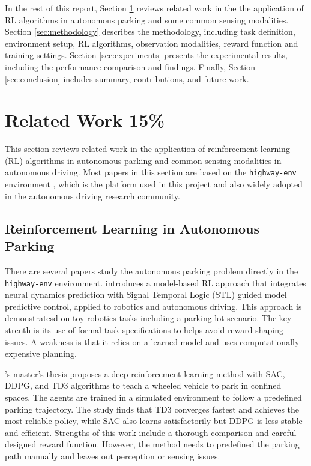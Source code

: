 \documentclass{article}
\begin{document}
In the rest of this report, Section \ref{sec:related_work} reviews related work in the the application of RL algorithms in autonomous parking and some common sensing modalities. Section \ref{sec:methodology} describes the methodology, including task definition, environment setup, RL algorithms, observation modalities, reward function and training settings. Section \ref{sec:experiments} presents the experimental results, including the performance comparison and findings. Finally, Section \ref{sec:conclusion} includes summary, contributions, and future work.

\newpage

\section{Related Work 15\%}\label{sec:related_work}

This section reviews related work in the application of reinforcement learning (RL) algorithms in autonomous parking and common sensing modalities in autonomous driving. Most papers in this section are based on the \texttt{highway-env} environment \cite{highway-env}, which is the platform used in this project and also widely adopted in the autonomous driving research community.

\subsection{Reinforcement Learning in Autonomous Parking}

There are several papers study the autonomous parking problem directly in the \texttt{highway-env} environment. \citet{kapoor2020model} introduces a model-based RL approach that integrates neural dynamics prediction with Signal Temporal Logic (STL) guided model predictive control, applied to robotics and autonomous driving. This approach is demonstratesd on toy robotics tasks including a parking-lot scenario. The key strenth is its use of formal task specifications to helps avoid reward-shaping issues. A weakness is that it relies on a learned model and uses computationally expensive planning.

\citet{moreira2021deep}'s master's thesis proposes a deep reinforcement learning method with SAC, DDPG, and TD3 algorithms to teach a wheeled vehicle to park in confined spaces. The agents are trained in a simulated environment to follow a predefined parking trajectory. The study finds that TD3 converges fastest and achieves the most reliable policy, while SAC also learns satisfactorily but DDPG is less stable and efficient. Strengths of this work include a thorough comparison and careful designed reward function. However, the method needs to predefined the parking path manually and leaves out perception or sensing issues.
\end{document}
